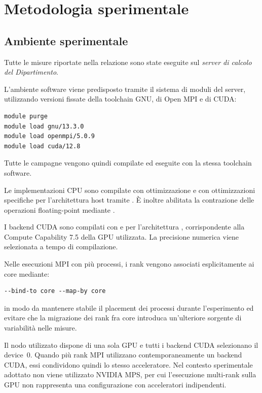 \chapter{Metodologia sperimentale}
\label{cap:metodologia}

\section{Ambiente sperimentale}
\label{sec:ambiente-sperimentale}

Tutte le misure riportate nella relazione sono state eseguite sul \emph{server di
calcolo del Dipartimento}.

L'ambiente software viene predisposto tramite il sistema di moduli del
server, utilizzando versioni fissate della toolchain GNU, di Open MPI e di
CUDA:

\begin{verbatim}
module purge
module load gnu/13.3.0
module load openmpi/5.0.9
module load cuda/12.8
\end{verbatim}

Tutte le campagne vengono quindi compilate ed eseguite con la stessa
toolchain software.

Le implementazioni CPU sono compilate con ottimizzazione  e con
ottimizzazioni specifiche per l'architettura host tramite
. È inoltre abilitata la contrazione delle operazioni
floating-point mediante .

I backend CUDA sono compilati con  e per l'architettura , corrispondente
alla Compute Capability 7.5 della GPU utilizzata. La precisione numerica
viene selezionata a tempo di compilazione.

Nelle esecuzioni MPI con più processi, i rank vengono associati
esplicitamente ai core mediante:

\begin{verbatim}
--bind-to core --map-by core
\end{verbatim}

in modo da mantenere stabile il placement dei processi durante
l'esperimento ed evitare che la migrazione dei rank fra core introduca
un'ulteriore sorgente di variabilità nelle misure.

Il nodo utilizzato dispone di una sola GPU e tutti i backend CUDA
selezionano il device~0. Quando più rank MPI utilizzano contemporaneamente
un backend CUDA, essi condividono quindi lo stesso acceleratore. Nel
contesto sperimentale adottato non viene utilizzato NVIDIA MPS, per cui
l'esecuzione multi-rank sulla GPU non rappresenta una configurazione con
acceleratori indipendenti.

